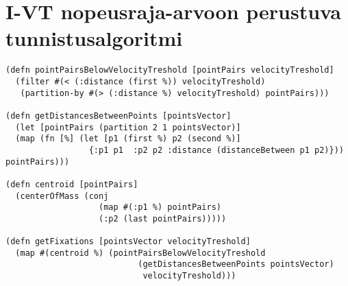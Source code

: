 \section{I-VT nopeusraja-arvoon perustuva tunnistusalgoritmi}
\label{sec:IVT-implementation}

\begin{verbatim}
(defn pointPairsBelowVelocityTreshold [pointPairs velocityTreshold]
  (filter #(< (:distance (first %)) velocityTreshold)
   (partition-by #(> (:distance %) velocityTreshold) pointPairs)))

(defn getDistancesBetweenPoints [pointsVector]
  (let [pointPairs (partition 2 1 pointsVector)]
  (map (fn [%] (let [p1 (first %) p2 (second %)]
                 {:p1 p1  :p2 p2 :distance (distanceBetween p1 p2)})) pointPairs)))

(defn centroid [pointPairs]
  (centerOfMass (conj
                   (map #(:p1 %) pointPairs)
                   (:p2 (last pointPairs)))))

(defn getFixations [pointsVector velocityTreshold]
  (map #(centroid %) (pointPairsBelowVelocityTreshold
                           (getDistancesBetweenPoints pointsVector)
                            velocityTreshold)))
\end{verbatim}

%
%
%
%

